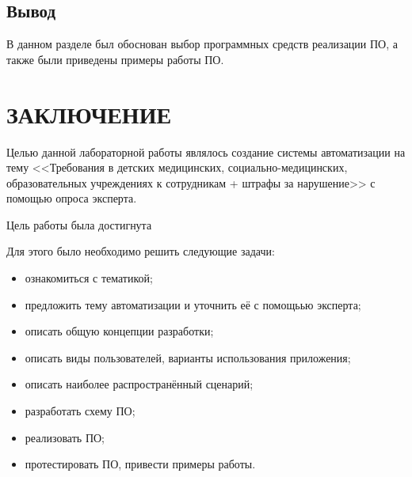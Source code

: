 \documentclass[12pt]{report}
\begin{document}
\section*{Вывод}
В данном разделе был обоснован выбор программных средств реализации ПО, а также были приведены примеры работы ПО.

\chapter*{ЗАКЛЮЧЕНИЕ}
Целью данной лабораторной работы являлось создание системы автоматизации на тему <<Требования в детских медицинских, социально-медицинских, образовательных учреждениях к сотрудникам + штрафы за нарушение>> с помощью опроса эксперта.

Цель работы была достигнута

Для этого было необходимо решить следующие задачи:
\begin{itemize}
    \item ознакомиться с тематикой;
    \item предложить тему автоматизации и уточнить её с помощьью эксперта;
    \item описать общую концепции разработки;
    \item описать виды пользователей, варианты использования приложения;
    \item описать наиболее распространённый сценарий;
    \item разработать схему ПО;
    \item реализовать ПО;
    \item протестировать ПО, привести примеры работы.
\end{itemize}
\clearpage

\printbibliography[title={СПИСОК ИСПОЛЬЗОВАННЫХ\\ ИСТОЧНИКОВ}]
\end{document}
